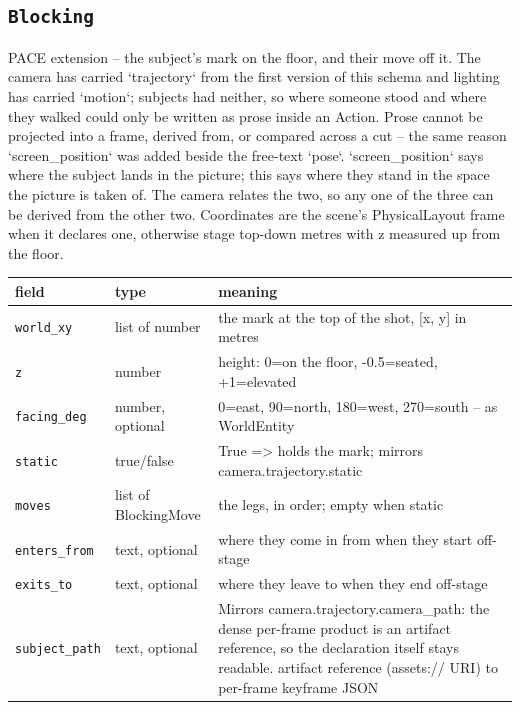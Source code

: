 \subsection*{\texttt{Blocking}}
\noindent PACE extension -- the subject's mark on the floor, and their move off it. The camera has carried `trajectory` from the first version of this schema and lighting has carried `motion`; subjects had neither, so where someone stood and where they walked could only be written as prose inside an Action. Prose cannot be projected into a frame, derived from, or compared across a cut -- the same reason `screen\_\allowbreak position` was added beside the free-text `pose`. `screen\_\allowbreak position` says where the subject lands in the picture; this says where they stand in the space the picture is taken of. The camera relates the two, so any one of the three can be derived from the other two. Coordinates are the scene's PhysicalLayout frame when it declares one, otherwise stage top-down metres with z measured up from the floor.

\begin{longtable}{@{}R{0.24\textwidth}R{0.21\textwidth}R{0.49\textwidth}@{}}
\toprule \textbf{field} & \textbf{type} & \textbf{meaning} \\ \midrule
\endhead
\texttt{world\_\allowbreak xy} & list of number & the mark at the top of the shot, [x, y] in metres \\
\texttt{z} & number & height: 0=on the floor, -0.5=seated, +1=elevated \\
\texttt{facing\_\allowbreak deg} & number, optional & 0=east, 90=north, 180=west, 270=south -- as WorldEntity \\
\texttt{static} & true/\allowbreak{}false & True => holds the mark; mirrors camera.trajectory.static \\
\texttt{moves} & list of BlockingMove & the legs, in order; empty when static \\
\texttt{enters\_\allowbreak from} & text, optional & where they come in from when they start off-stage \\
\texttt{exits\_\allowbreak to} & text, optional & where they leave to when they end off-stage \\
\texttt{subject\_\allowbreak path} & text, optional & Mirrors camera.trajectory.camera\_\allowbreak path: the dense per-frame product is an artifact reference, so the declaration itself stays readable. artifact reference (assets:/\allowbreak{}/\allowbreak{} URI) to per-frame keyframe JSON \\
\bottomrule
\end{longtable}

